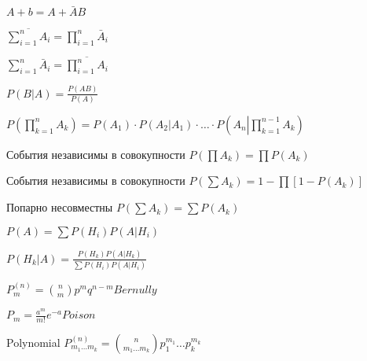 $A + b = A + \bar{A}B$

$\displaystyle \overline{\sum_{i=1}^{n}A_i} = \prod_{i=1}^{n}\bar{A}_i$

$\displaystyle \sum_{i=1}^{n}\bar{A}_i = \overline{\prod_{i=1}^{n}A_i}$

$\displaystyle P(B|A) = \frac{P(AB)}{P(A)}$

$\displaystyle P\left(\prod_{k=1}^{n}A_k\right) = P(A_1)\cdot P(A_2|A_1)\cdot\ldots\cdot P\left(A_n\left|\right.\prod_{k=1}^{n-1}A_k\right)$

События независимы в совокупности $P(\prod A_k) = \prod{P(A_k)}$

События независимы в совокупности $P(\sum{A_k}) = 1-\prod[1-P(A_k)]$  %

Попарно несовместны $P(\sum{A_k}) = \sum{P(A_k)}$

$P(A) = \sum P(H_i)P(A|H_i)$

$\displaystyle P(H_k|A) = \frac{P(H_k)P(A|H_k)}{\sum P(H_i)P(A|H_i)}$

$P^{(n)}_m = \binom{n}{m}p^mq^{n-m} Bernully$

$\displaystyle P_m = \frac{a^m}{m!}e^{-a} Poison$

Polynomial $P^{(n)}_{m_1\ldots m_k} = \binom{n}{m_1\ldots m_k}p_1^{m_1}\ldots p_k^{m_k}$

